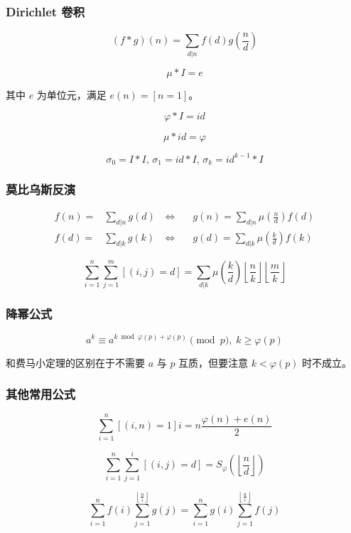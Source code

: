 \subsubsection[狄利克雷（Dirichlet）卷积]{Dirichlet 卷积}
	$$ (f * g)(n) = \sum_{d | n} f(d) g\left( \frac n d \right) $$
	
	$$\mu * I = e$$

	其中 $e$ 为单位元，满足 $e(n) = [n = 1]$。

	$$\varphi * I = id $$

	$$\mu * id = \varphi $$

	$$\sigma_0 = I * I ,\, \sigma_1 = id * I ,\, \sigma_k = id^{k - 1} * I$$

\subsubsection{莫比乌斯反演}
	$$ \begin{aligned}
		f(n) = & \sum_{d | n} g(d) & \, \iff \quad & g(n) = \sum_{d | n} \mu\left( \frac n d \right) f(d) \\
		f(d) = & \sum_{d | k} g(k) & \, \iff \quad & g(d) = \sum_{d | k} \mu\left( \frac k d \right) f(k)
	\end{aligned} $$

	$$\sum_{i = 1} ^ n \sum_{j = 1} ^ m \left[(i, j) = d\right] = \sum_{d | k} \mu\left( \frac k d \right) \left\lfloor \frac n k \right\rfloor \left\lfloor \frac m k \right\rfloor$$

\subsubsection{降幂公式}

$$ a^k \equiv a ^ {k \bmod \varphi(p) + \varphi(p)} \pmod p,\; k \ge \varphi(p) $$

和费马小定理的区别在于不需要 $a$ 与 $p$ 互质，但要注意 $k < \varphi(p)$ 时不成立。

\subsubsection{其他常用公式}

	$$\sum_{i = 1} ^ n \left[(i, n) = 1\right] i = n \frac {\varphi(n) + e(n)} 2$$
	
	$$\sum_{i = 1} ^ n \sum_{j = 1} ^ i \left[(i, j) = d\right] = S_\varphi \left( \left\lfloor \frac n d \right\rfloor \right)$$

	$$ \sum_{i = 1} ^ n f(i) \sum_{j = 1} ^ {\left\lfloor \frac n i \right\rfloor} g(j) = \sum_{i = 1} ^ n g(i) \sum_{j = 1} ^ {\left\lfloor \frac n i \right\rfloor} f(j) $$
